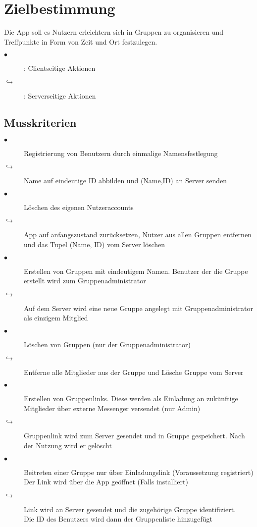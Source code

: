 
\section{Zielbestimmung}
Die App soll es Nutzern erleichtern sich in Gruppen zu organisieren
und Treffpunkte in Form von Zeit und Ort festzulegen.
\begin{description}
\item[$\bullet$]: Clientseitige Aktionen
\item[$\hookrightarrow$]: Serverseitige Aktionen
\end{description}
\subsection{Musskriterien}
\begin{description}
\item[$\bullet$] Registrierung von Benutzern durch einmalige Namensfestlegung
\item[$\hookrightarrow$] Name auf eindeutige ID abbilden und (Name,ID) an Server senden
\item[$\bullet$] Löschen des eigenen Nutzeraccounts
\item[$\hookrightarrow$] App auf anfangszustand zurücksetzen, Nutzer aus allen Gruppen entfernen und das Tupel (Name, ID) vom Server löschen
\item[$\bullet$] Erstellen von Gruppen mit eindeutigem Namen. Benutzer der die Gruppe erstellt wird zum Gruppenadministrator
\item[$\hookrightarrow$] Auf dem Server wird eine neue Gruppe angelegt mit Gruppenadministrator als einzigem Mitglied
\item[$\bullet$] Löschen von Gruppen (nur der Gruppenadministrator)
\item[$\hookrightarrow$] Entferne alle Mitglieder aus der Gruppe und Lösche Gruppe vom Server
\item[$\bullet$] Erstellen von Gruppenlinks. Diese werden als Einladung an zukünftige Mitglieder über externe Messenger versendet (nur Admin)
\item[$\hookrightarrow$] Gruppenlink wird zum Server gesendet und in Gruppe gespeichert. Nach der Nutzung wird er gelöscht
\item[$\bullet$] Beitreten einer Gruppe nur über Einladungslink (Voraussetzung registriert)
     Der Link wird über die App geöffnet (Falls installiert)
\item[$\hookrightarrow$] Link wird an Server gesendet und die zugehörige Gruppe identifiziert.\\ Die ID des Benutzers wird dann der Gruppenliste hinzugefügt

\end{description}
